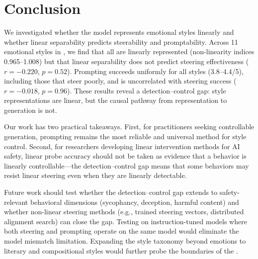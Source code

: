 \section{Conclusion}
\label{sec:conclusion}

We investigated whether the model represents emotional styles linearly and whether linear separability predicts steerability and promptability. Across 11 emotional styles in \pythia, we find that all are linearly represented (non-linearity indices 0.965--1.008) but that linear separability does not predict steering effectiveness ($r = -0.220$, $p = 0.52$). Prompting succeeds uniformly for all styles (3.8--4.4/5), including those that steer poorly, and is uncorrelated with steering success ($r = -0.018$, $p = 0.96$). These results reveal a detection--control gap: style representations are linear, but the causal pathway from representation to generation is not.

Our work has two practical takeaways. First, for practitioners seeking controllable generation, prompting remains the most reliable and universal method for style control. Second, for researchers developing linear intervention methods for AI safety, linear probe accuracy should not be taken as evidence that a behavior is linearly controllable---the detection--control gap means that some behaviors may resist linear steering even when they are linearly detectable.

Future work should test whether the detection--control gap extends to safety-relevant behavioral dimensions (sycophancy, deception, harmful content) and whether non-linear steering methods (e.g., trained steering vectors, distributed alignment search) can close the gap. Testing on instruction-tuned models where both steering and prompting operate on the same model would eliminate the model mismatch limitation. Expanding the style taxonomy beyond emotions to literary and compositional styles would further probe the boundaries of the \lrh.
